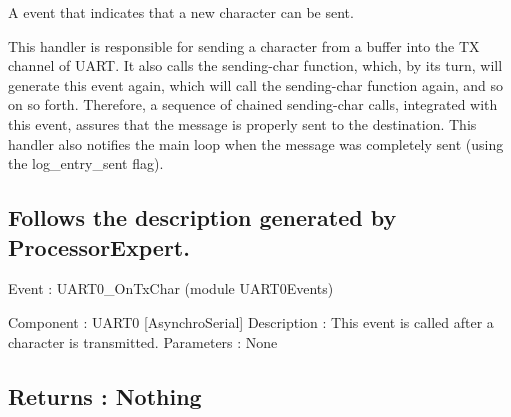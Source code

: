 A event that indicates that a new character can be sent. 

This handler is responsible for sending a character from a buffer into the TX channel of U\+A\+RT. It also calls the sending-\/char function, which, by its turn, will generate this event again, which will call the sending-\/char function again, and so on so forth. Therefore, a sequence of chained sending-\/char calls, integrated with this event, assures that the message is properly sent to the destination. This handler also notifies the main loop when the message was completely sent (using the log\+\_\+entry\+\_\+sent flag).

\subsection*{Follows the description generated by Processor\+Expert. }

Event \+: U\+A\+R\+T0\+\_\+\+On\+Tx\+Char (module U\+A\+R\+T0\+Events)

Component \+: U\+A\+R\+T0 \mbox{[}Asynchro\+Serial\mbox{]} Description \+: This event is called after a character is transmitted. Parameters \+: None \subsection*{Returns \+: Nothing }